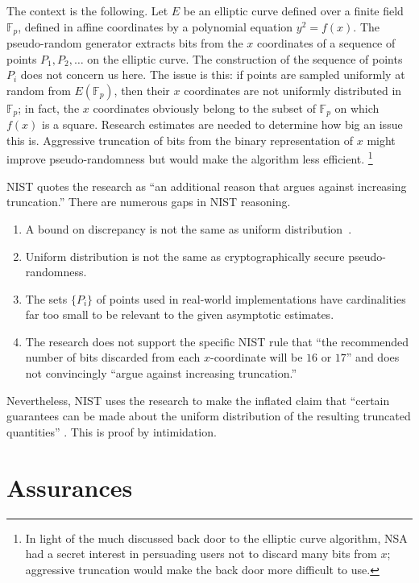 \documentclass[11pt]{amsart} %
\newcommand{\ring}[1]{\mathbb{#1}}
\begin{document}
The context is the following.  Let $E$ be an elliptic curve defined over a finite field $\ring{F}_p$,
defined in affine coordinates by a polynomial equation
$y^2 = f(x)$.
The pseudo-random generator extracts bits from the
 $x$ coordinates of a sequence of points $P_1, P_2,\ldots $ 
on the elliptic curve.  The construction of the sequence of points $P_i$ does not concern us here.
The issue is this: if points are sampled uniformly at random from $E(\ring{F}_p)$, then their $x$ coordinates are 
not uniformly distributed in $\ring{F}_p$; in fact, the $x$ coordinates obviously belong to the subset of $\ring{F}_p$ on which $f(x)$ is a square.  
Research estimates are needed to
determine how big an issue this is.   Aggressive truncation of bits from the binary representation of $x$ might improve pseudo-randomness
but would make the algorithm less efficient.%
\footnote{In light of the much discussed back door to the elliptic curve algorithm, NSA had a secret interest
in persuading users not to discard many bits from  $x$; aggressive truncation would
make the back door more difficult to use.}

NIST quotes the research \cite{MS2000} as ``an additional reason that argues against increasing truncation.''
There are numerous gaps in NIST reasoning.
\begin{enumerate}
\item A bound on discrepancy is not the same as uniform distribution~\cite{SDA1651}.
\item Uniform distribution is not the same as cryptographically secure pseudo-randomness.
\item The sets $\{P_i\}$ of points  used in real-world implementations have cardinalities far too small to
be relevant to the given asymptotic estimates.
\item The research does not support the specific NIST rule that ``the recommended number of bits discarded
from each $x$-coordinate will be $16$ or $17$'' and does not convincingly ``argue against increasing truncation.''
\end{enumerate}
Nevertheless, NIST uses the research to make the inflated claim that ``certain
guarantees can be made about the uniform distribution of the resulting truncated quantities'' \cite{NIST}.
This is proof by intimidation.

\section{Assurances}
\end{document}
